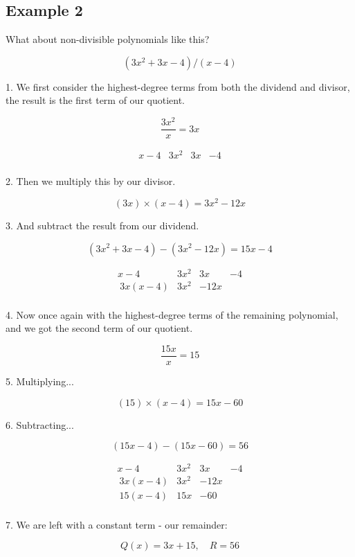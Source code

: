 \subsection{Example 2}
\label{sss:exam-5bdd}

What about non-divisible polynomials like this?

\[
(3x^2 + 3x - 4) / (x - 4)
\]

1. We first consider the highest-degree terms from both the dividend and divisor, the
result is the first term of our quotient.

\[
\frac{3x^2}{x} = 3x
\]

\[
\begin{array}{r|ccc}
   x - 4 & 3x^2 & 3x & -4 \\   
\end{array}
\]

2. Then we multiply this by our divisor.

   \[
(3x) \times (x - 4) = 3x^2 - 12x
\]

3. And subtract the result from our dividend.

\[
(3x^2 + 3x - 4) - (3x^2 - 12x) = 15x - 4
\]

\[
\begin{array}{r|ccc}
x - 4 & 3x^2 & 3x & -4 \\\   3x(x - 4) & 3x^2 & -12x & \\   \end{array}
\]

4. Now once again with the highest-degree terms of the remaining polynomial, and we got
the second term of our quotient.

\[
\frac{15x}{x} = 15
\]

5. Multiplying...

\[
(15) \times (x - 4) = 15x - 60
\]

6. Subtracting...

\[
(15x - 4) - (15x - 60) = 56
\]

\[
\begin{array}{r|ccc}
x - 4 & 3x^2 & 3x & -4 \\\   3x(x - 4) & 3x^2 & -12x & \\\   15(x - 4) & 15x & -60 \\   \end{array}
\]

7. We are left with a constant term - our remainder:

\[
Q(x) = 3x + 15, \quad R = 56
\]

